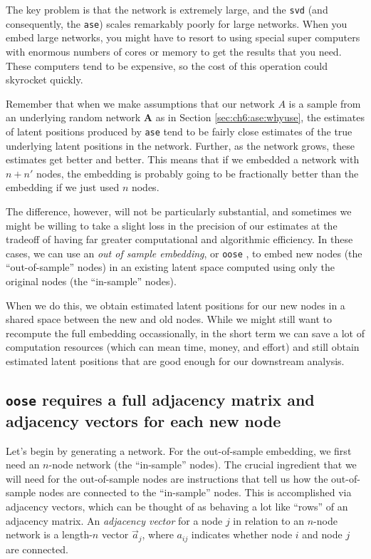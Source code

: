 The key problem is that the network is extremely large, and the \texttt{svd} (and consequently, the \texttt{ase}) scales remarkably poorly for large networks. When you embed large networks, you might have to resort to using special super computers with enormous numbers of cores or memory to get the results that you need. These computers tend to be expensive, so the cost of this operation could skyrocket quickly. 

Remember that when we make assumptions that our network $A$ is a sample from an underlying random network $\mathbf A$ as in Section \ref{sec:ch6:ase:whyuse}, the estimates of latent positions produced by \texttt{ase} tend to be fairly close estimates of the true underlying latent positions in the network. Further, as the network grows, these estimates get better and better. This means that if we embedded a network with $n + n'$ nodes, the embedding is probably going to be fractionally better than the embedding if we just used $n$ nodes. 

The difference, however, will not be particularly substantial, and sometimes we might be willing to take a slight loss in the precision of our estimates at the tradeoff of having far greater computational and algorithmic efficiency. In these cases, we can use an \textit{out of sample embedding}, or \texttt{oose} \cite{Levin2018Jul,Bengio2003}, to embed new nodes (the ``out-of-sample'' nodes) in an existing latent space computed using only the original nodes (the ``in-sample'' nodes). 

When we do this, we obtain estimated latent positions for our new nodes in a shared space between the new and old nodes. While we might still want to recompute the full embedding occassionally, in the short term we can save a lot of computation resources (which can mean time, money, and effort) and still obtain estimated latent positions that are good enough for our downstream analysis.

\subsection{\texttt{oose} requires a full adjacency matrix and adjacency vectors for each new node}

Let's begin by generating a network. For the out-of-sample embedding, we first need an $n$-node network (the ``in-sample'' nodes). The crucial ingredient that we will need for the out-of-sample nodes are instructions that tell us how the out-of-sample nodes are connected to the ``in-sample'' nodes. This is accomplished via adjacency vectors, which can be thought of as behaving a lot like ``rows'' of an adjacency matrix. An \textit{adjacency vector} for a node $j$ in relation to an $n$-node network is a length-$n$ vector $\vec a_j$, where $a_{ij}$ indicates whether node $i$ and node $j$ are connected.

